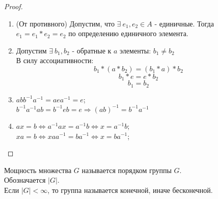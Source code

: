 \begin{proof} \tab
    \begin{enumerate}
        \item (От противного) Допустим, что $\exists \ e_1,e_2 \in A$ - единичные. Тогда $e_1 = e_1 * e_2 = e_2$ по определению единичного элемента.
        \item Допустим $\exists \ b_1,b_2$ - обратные к $a$ элементы: $b_1 \not = b_2$ \\
        В силу ассоциативности:
        $$b_1 * (a * b_2) = (b_1 * a) * b_2$$
        $$b_1 * e = e * b_2$$ 
        $$b_1 = b_2$$ 
        \item $abb^{-1}a^{-1} = aea^{-1} = e$;\\
        $b^{-1}a^{-1}ab = b^{-1}eb = e \Longrightarrow (ab)^{-1} = b^{-1}a^{-1}$
        \item $ax = b \Longleftrightarrow a^{-1}ax = a^{-1}b \Longleftrightarrow x = a^{-1}b$;\\
        $xa = b \Longleftrightarrow xaa^{-1} = ba^{-1} \Longleftrightarrow x = ba^{-1}$; 
    \end{enumerate} 
\end{proof}
\begin{definition}
    Мощность множества $G$ называется порядком группы $G$.\\ Обозначается $|G|$.\\
    Если $|G| < \infty$, то группа называется конечной, иначе бесконечной.
\end{definition}
